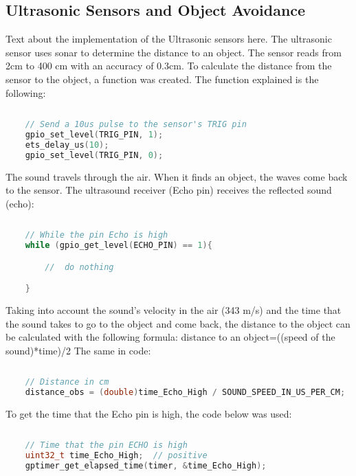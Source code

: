\documentclass[../report.tex]{subfiles}
\begin{document}
\subsection{Ultrasonic Sensors and Object Avoidance}
Text about the implementation of the Ultrasonic sensors here.
The ultrasonic sensor uses sonar to determine the distance to an object. 
The sensor reads from 2cm to 400 cm with an accuracy of 0.3cm. To calculate
 the distance from the sensor to the object, a function was created. 
 The function explained is the following:

 \begin{lstlisting}[language=c,caption={The TRIG pin's Code},label={code:ultrasonic}]
    
    // Send a 10us pulse to the sensor's TRIG pin
    gpio_set_level(TRIG_PIN, 1);
    ets_delay_us(10);
    gpio_set_level(TRIG_PIN, 0);

\end{lstlisting}

The sound travels through the air. When it finds an object, 
the waves come back to the sensor. 
The ultrasound receiver (Echo pin) receives the reflected sound (echo):

\begin{lstlisting}[language=c,caption={The ECHO pin's Code},label={code:ultrasonic}]
    
    // While the pin Echo is high
    while (gpio_get_level(ECHO_PIN) == 1){

        //  do nothing

    }

\end{lstlisting}

Taking into account the sound’s velocity in the air (343 m/s) and the 
time that the sound takes to go to the object and come back, the distance
 to the object can be calculated with the following formula:
distance to an object=((speed of the sound)*time)/2
The same in code:

\begin{lstlisting}[language=c,caption={The distance's Code},label={code:ultrasonic}]
    
    // Distance in cm
    distance_obs = (double)time_Echo_High / SOUND_SPEED_IN_US_PER_CM;


\end{lstlisting}

To get the time that the Echo pin is high, the code below was used:

\begin{lstlisting}[language=c,caption={code to get the time that ECHO is high},label={code:ultrasonic}]
    
    // Time that the pin ECHO is high 
    uint32_t time_Echo_High;  // positive
    gptimer_get_elapsed_time(timer, &time_Echo_High);


\end{lstlisting}
\end{document}
